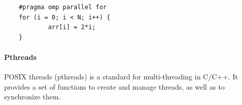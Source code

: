 \documentclass[openany,12pt]{book}
\begin{document}
\begin{center}
  \begin{minipage}{0.9\textwidth}
    \begin{lstlisting}
    #pragma omp parallel for
    for (i = 0; i < N; i++) {
            arr[i] = 2*i;
    } \end{lstlisting}
  \end{minipage}
\end{center}


\paragraph{Pthreads} POSIX threads (pthreads) is a standard for multi-threading in C/C++. It provides a set of functions to create and manage threads, as well as to synchronize them. 
\end{document}
